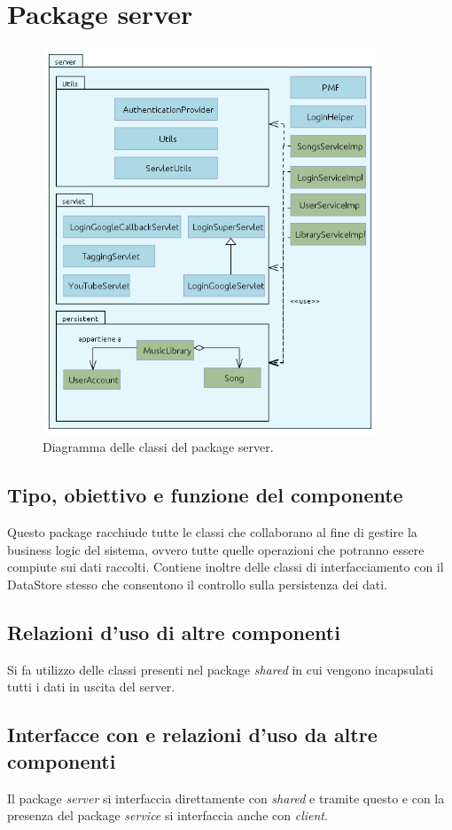 \section{Package server}
\begin{figure}[h]
  \centering
  \includegraphics[width=10cm]{img/ST/Server.png}
\caption{Diagramma delle classi del package server.}
\end{figure}

\subsection*{Tipo, obiettivo e funzione del componente} %
Questo package racchiude tutte le classi che collaborano al fine di gestire la
business logic del sistema, ovvero tutte quelle operazioni che potranno essere
compiute sui dati raccolti. Contiene inoltre delle classi di interfacciamento
con il DataStore stesso che consentono il controllo sulla persistenza dei dati.

\subsection*{Relazioni d'uso di altre componenti}
Si fa utilizzo delle classi presenti nel package \emph{shared} in cui vengono
incapsulati tutti i dati in uscita del server.

\subsection*{Interfacce con e relazioni d'uso da altre componenti}
Il package \emph{server} si interfaccia direttamente con \emph{shared} e tramite
questo e con la presenza del package \emph{service} si interfaccia anche con
\emph{client}.

